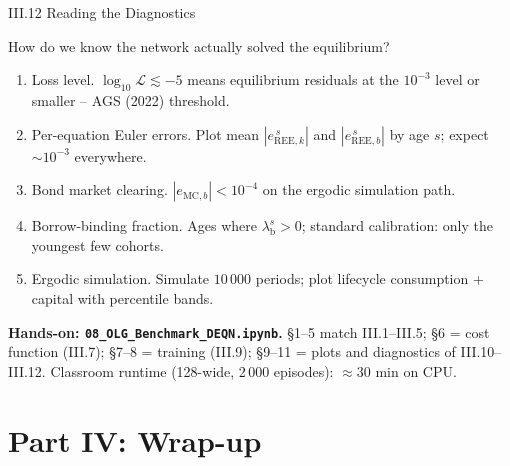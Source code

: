 \documentclass[aspectratio=169,11pt]{beamer}
\newcommand{\emphc}[1]{\textcolor{harvardcrimson}{#1}}
\newcommand{\Loss}{\mathcal{L}}
\begin{document}
\begin{frame}{III.12 Reading the Diagnostics}
\footnotesize
\begin{block}{How do we know the network actually solved the equilibrium?}
\vspace{-2pt}\begin{enumerate}\itemsep1pt
    \item \emphc{Loss level.}  $\log_{10}\Loss \lesssim -5$ means equilibrium residuals at the $10^{-3}$ level or smaller -- AGS (2022) threshold.
    \item \emphc{Per-equation Euler errors.}  Plot mean $|e_{\text{REE},k}^{\,s}|$ and $|e_{\text{REE},b}^{\,s}|$ by age $s$; expect $\sim 10^{-3}$ everywhere.
    \item \emphc{Bond market clearing.}  $|e_{\text{MC},b}| < 10^{-4}$ on the ergodic simulation path.
    \item \emphc{Borrow-binding fraction.}  Ages where $\lambda_{\text{b}}^s > 0$; standard calibration: only the youngest few cohorts.
    \item \emphc{Ergodic simulation.}  Simulate $10\,000$ periods; plot lifecycle consumption + capital with percentile bands.
\end{enumerate}
\end{block}

\vspace{-2pt}
\textbf{Hands-on: \texttt{08\_OLG\_Benchmark\_DEQN.ipynb}.}  \S 1--5 match III.1--III.5; \S 6 = cost function (III.7); \S 7--8 = training (III.9); \S 9--11 = plots and diagnostics of III.10--III.12.  Classroom runtime (128-wide, 2\,000 episodes): $\approx 30$ min on CPU.
\end{frame}



\section{Part IV: Wrap-up}
\end{document}
